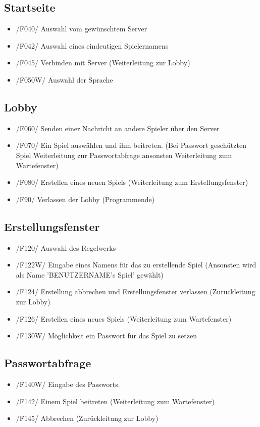 \documentclass{article}
\begin{document}
\subsection{Startseite}
\begin{itemize}
	\item /F040/ Auswahl vom gewünschtem \gls{Server} 
	\item /F042/ Auswahl eines eindeutigen Spielernamens
	\item /F045/ Verbinden mit Server (Weiterleitung zur \gls{Lobby})
	\item /F050W/ Auswahl der Sprache
\end{itemize}

\subsection{\gls{Lobby}}
\begin{itemize}
	\item /F060/ Senden einer Nachricht an andere Spieler über den \gls{Server}
	\item /F070/ Ein Spiel auswählen und ihm beitreten. (Bei Passwort geschützten Spiel Weiterleitung zur Passwortabfrage ansonsten Weiterleitung zum \gls{Wartefenster})
	\item /F080/ Erstellen eines neuen Spiels (Weiterleitung zum \gls{Erstellungsfenster})
	\item /F90/ Verlassen der \gls{Lobby} (Programmende)
\end{itemize}

\subsection{\gls{Erstellungsfenster}}
\begin{itemize}
	\item /F120/ Auswahl des \gls{Regelwerk}s
	\item /F122W/ Eingabe eines Namens für das zu erstellende Spiel (Ansonsten wird als Name 'BENUTZERNAME's Spiel' gewählt)
	\item /F124/ Erstellung abbrechen und \gls{Erstellungsfenster} verlassen (Zurückleitung zur Lobby)
	\item /F126/ Erstellen eines neues Spiels (Weiterleitung zum \gls{Wartefenster})
	\item /F130W/ Möglichkeit ein Passwort für das Spiel zu setzen
\end{itemize}

\subsection{Passwortabfrage}
\begin{itemize}
	\item /F140W/ Eingabe des Passworts.
	\item /F142/ Einem Spiel beitreten (Weiterleitung zum \gls{Wartefenster})
	\item /F145/ Abbrechen (Zurückleitung zur \gls{Lobby})
\end{itemize}
\end{document}
